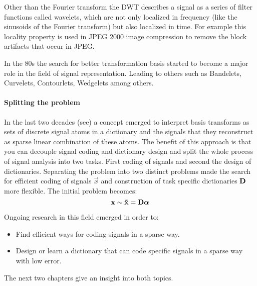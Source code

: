 Other than the Fourier transform the DWT describes a signal as a series of
filter functions called wavelets, which are not only localized in frequency
(like the sinusoids of the Fourier transform) but also localized in time. 
For example this locality property is used in JPEG 2000 image compression to
remove the block artifacts that occur in JPEG. 

In the 80s the search for better transformation basis started to become a major
role in the field of signal representation. Leading to others such as Bandelets,
Curvelets, Contourlets, Wedgelets among others.

\paragraph{Splitting the problem}
In the last two decades (see\cite{Olshausen1996,Mallat1993}) a concept emerged
to interpret basis transforms as sets of discrete signal atoms in a dictionary
and the signals that they reconstruct as sparse linear combination of these
atoms. The benefit of this approach is that you can decouple signal coding and
dictionary design and split the whole process of signal analysis into two tasks.
First coding of signals and second the design of dictionaries. Separating the
problem into two distinct problems made the search for efficient coding of
signals $\vec{x}$ and construction of task specific dictionaries $\boldsymbol{\mathrm{D}}$ more
flexible. The initial problem becomes:
\begin{equation}
 \boldsymbol{\mathrm{x}} \sim \boldsymbol{\mathrm{\tilde{x}}}  = \boldsymbol{\mathrm{D}}\boldsymbol{\mathrm{\alpha}}
\end{equation}

Ongoing research in this field emerged in order to:
\begin{itemize}
 \item Find efficient ways for coding signals in a sparse way.
 \item Design or learn a dictionary that can code specific signals in
a sparse way with low error.
\end{itemize}
The next two chapters give an insight into both topics. 



